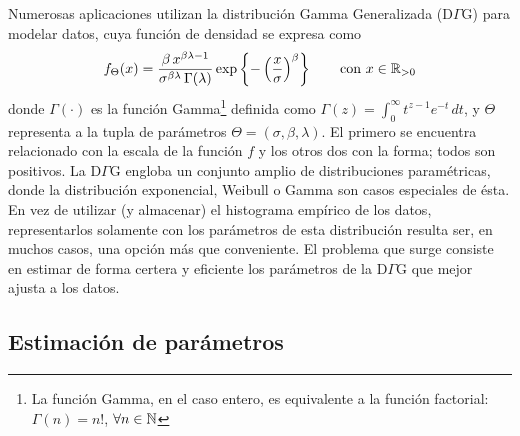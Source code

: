 \documentclass[a4paper,10pt,twoside]{article}
\begin{document}
Numerosas aplicaciones utilizan la distribuci\'on Gamma Generalizada (D$\Gamma$G) para modelar datos, cuya funci\'on de densidad se expresa como $$f_\Theta(x)=\frac{\beta\, x^{\beta \lambda - 1}}{\sigma^{\beta \lambda}\, \Gamma(\lambda)} \exp\left\{-\left(\frac{x}{\sigma} \right)^\beta \right\}\qquad\textrm{con } x\in\mathbb{R}_{>0}$$ donde 
$\Gamma(\cdot)$ es la funci\'on Gamma\footnote{La funci\'on Gamma, en el caso entero, es equivalente a la funci\'on factorial: $\Gamma(n)=n!$, $\forall n\in\mathbb{N}$ } definida como $\Gamma(z)=\int_0^{\infty}{t^{z-1}e^{-t}\,dt}$, y $\Theta$ representa a la tupla de par\'ametros $\Theta=(\sigma,\beta,\lambda)$. El primero se encuentra relacionado con la escala de la funci\'on $f$ y los otros dos con la forma; todos son positivos.
La D$\Gamma$G engloba un conjunto amplio de distribuciones param\'etricas, donde la distribuci\'on exponencial, Weibull o Gamma son casos especiales de \'esta.
En vez de utilizar (y almacenar) el histograma emp\'irico de los datos, representarlos solamente con los par\'ametros de esta distribuci\'on resulta ser, en muchos casos, una opci\'on m\'as que conveniente. El problema que surge consiste en estimar de forma certera y eficiente los par\'ametros de la D$\Gamma$G que mejor ajusta a los datos.

\subsection{Estimaci\'on de par\'ametros}
\end{document}
